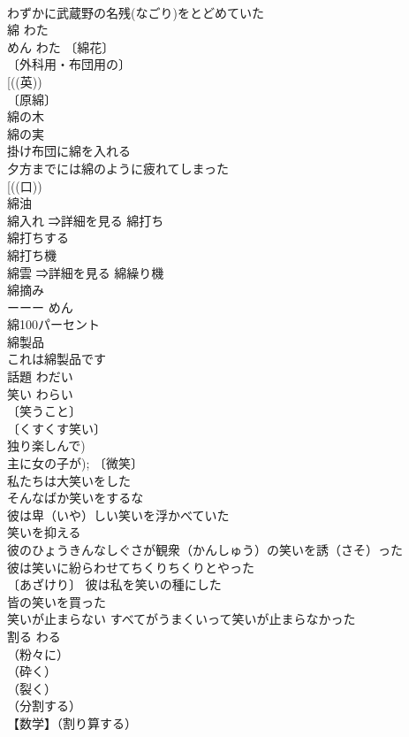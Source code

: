 \documentclass[8pt]{extreport}
\begin{document}
\begin{CJK}{UTF8}{min}
\\	わずかに武蔵野の名残(なごり)をとどめていた 
\\	綿	わた　
\\	めん	わた 〔綿花〕
\\	〔外科用・布団用の〕
\\	[((英)) 
\\	〔原綿〕
\\	綿の木 
\\	綿の実 
\\	掛け布団に綿を入れる 
\\	夕方までには綿のように疲れてしまった 
\\	[((口)) 
\\	綿油 
\\	綿入れ ⇒詳細を見る 綿打ち 
\\	綿打ちする 
\\	綿打ち機 
\\	綿雲 ⇒詳細を見る 綿繰り機 
\\	綿摘み 
\\	ーーー めん 
\\	綿100パーセント 
\\	綿製品 
\\	これは綿製品です 
\\	話題	わだい	
\\	笑い	わらい	
\\	〔笑うこと〕
\\	〔くすくす笑い〕
\\	独り楽しんで) 
\\	主に女の子が); 〔微笑〕
\\	私たちは大笑いをした 
\\	そんなばか笑いをするな 
\\	彼は卑（いや）しい笑いを浮かべていた 
\\	笑いを抑える 
\\	彼のひょうきんなしぐさが観衆（かんしゅう）の笑いを誘（さそ）った 
\\	彼は笑いに紛らわせてちくりちくりとやった 
\\	〔あざけり〕 彼は私を笑いの種にした 
\\	皆の笑いを買った 
\\	笑いが止まらない すべてがうまくいって笑いが止まらなかった 
\\	割る	わる	
\\	（粉々に）
\\	（砕く）
\\	（裂く）
\\	（分割する）
\\	【数学】（割り算する）

\end{CJK}
\end{document}
